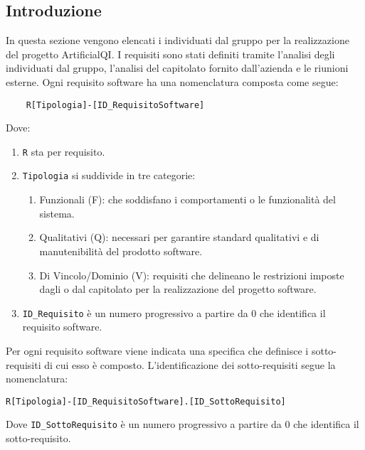 
\subsection{Introduzione}
\label{sec:requisiti_software}
In questa sezione vengono elencati i  individuati dal gruppo per la realizzazione del progetto ArtificialQI.
I requisiti sono stati definiti tramite l'analisi degli  individuati dal gruppo, l'analisi del capitolato fornito dall'azienda e le riunioni esterne.
Ogni requisito software ha una nomenclatura composta come segue:
\begin{lstlisting}
    R[Tipologia]-[ID_RequisitoSoftware]
\end{lstlisting}
Dove:
\begin{enumerate}
    \item \lstinline|R| sta per requisito.
    \item \lstinline|Tipologia| si suddivide in tre categorie:
    \begin{enumerate}
        \item Funzionali (F):  che soddisfano i comportamenti o le funzionalità del sistema.
        \item Qualitativi (Q):  necessari per garantire standard qualitativi e di manutenibilità
        del prodotto software.
        \item Di Vincolo/Dominio (V): requisiti che delineano le restrizioni imposte dagli  o dal capitolato 
        per la realizzazione del progetto software.
    \end{enumerate}
    \item \lstinline|ID_Requisito| è un numero progressivo a partire da 0 che identifica il requisito software.
\end{enumerate}  
Per ogni requisito software viene indicata una specifica che definisce i sotto-requisiti di cui esso è composto.
L'identificazione dei sotto-requisiti segue la nomenclatura:
\begin{lstlisting}
R[Tipologia]-[ID_RequisitoSoftware].[ID_SottoRequisito]
\end{lstlisting} 
Dove \lstinline|ID_SottoRequisito| è un numero progressivo a partire da 0 che identifica il sotto-requisito.
